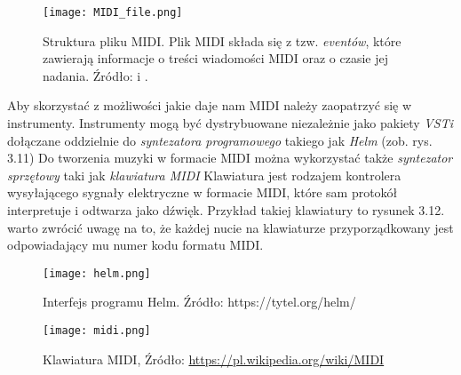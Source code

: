 \begin{figure}[H]\texttt{[image: MIDI\_file.png]}
\centering
\caption{Struktura pliku MIDI. Plik MIDI składa się z tzw. \textit{eventów}, które zawierają informacje o treści wiadomości MIDI oraz o czasie jej nadania. Źródło: \citep[s. 2 - 3]{MIDI_Format} i \citep{Tse2008}.}
\end{figure}

Aby skorzystać z możliwości jakie daje nam MIDI należy zaopatrzyć się w instrumenty. Instrumenty mogą być dystrybuowane niezależnie jako pakiety \textit{VSTi} dołączane oddzielnie do \textit{syntezatora programowego} takiego jak \textit{Helm} (zob. rys. 3.11)
Do tworzenia muzyki w formacie MIDI można wykorzystać także \textit{syntezator sprzętowy} taki jak \textit{klawiatura MIDI} Klawiatura jest rodzajem kontrolera wysyłającego sygnały elektryczne w formacie MIDI, które sam protokół interpretuje i odtwarza jako dźwięk. Przykład takiej klawiatury to rysunek 3.12. warto zwrócić uwagę na to, że każdej nucie na klawiaturze przyporządkowany jest odpowiadający mu numer kodu formatu MIDI.

\begin{figure}[H]
\centering
\texttt{[image: helm.png]}
\centering
\caption{Interfejs programu Helm. Źródło: https://tytel.org/helm/}
\end{figure}


\begin{figure}[H]
\begin{center}
\texttt{[image: midi.png]}
\centering
\caption{Klawiatura MIDI, Źródło: \href{https://pl.wikipedia.org/wiki/MIDI}{https://pl.wikipedia.org/wiki/MIDI}}
\centering
\end{center}
\end{figure}
 
